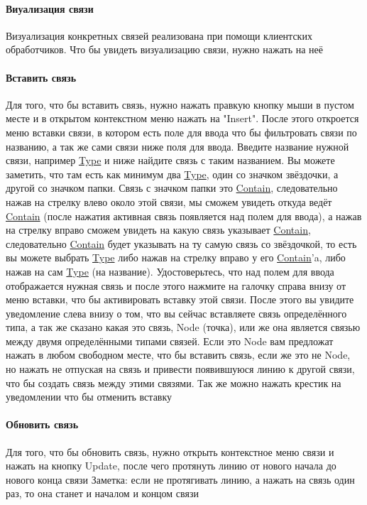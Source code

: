 \documentclass{article}
\begin{document}
\paragraph{Виуализация связи}
Визуализация конкретных связей реализована при помощи клиентских обработчиков.
Что бы увидеть визуализацию связи, нужно нажать на неё
\paragraph{Вставить связь}
Для того, что бы \hypertarget{DeepCase.InsertLink.Def}{вставить связь}, нужно нажать правкую кнопку мыши в пустом
месте и в открытом контекстном меню нажать на "Insert". После этого откроется
меню вставки связи, в котором есть поле для ввода что бы фильтровать связи по
названию, а так же сами связи ниже поля для ввода. Введите название нужной
связи, например \hyperlink{type.Def}{Type} и ниже найдите связь с таким
названием. Вы можете
заметить, что там есть как минимум два \hyperlink{type.Def}{Type}, один со
значком звёздочки, а
другой со значком папки. Связь с значком папки это
\hyperlink{Contain.Def}{Contain}, следовательно нажав
на стрелку влево около этой связи, мы сможем увидеть откуда ведёт
\hyperlink{Contain.Def}{Contain}
(после нажатия активная связь появляется над полем для ввода), а нажав на
стрелку вправо сможем увидеть на какую связь указывает
\hyperlink{Contain.Def}{Contain}, следовательно
\hyperlink{Contain.Def}{Contain} будет указывать на ту самую связь со
звёздочкой, то есть вы можете
выбрать \hyperlink{type.Def}{Type} либо нажав на стрелку вправо у его
\hyperlink{Contain.Def}{Contain}'a, либо нажав на сам
\hyperlink{type.Def}{Type} (на название). Удостоверьтесь, что над полем для
ввода отображается нужная
связь и после этого нажмите на галочку справа внизу от меню вставки, что бы
активировать вставку этой связи. После этого вы увидите уведомление слева внизу
о том, что вы сейчас вставляете связь определённого типа, а так же сказано
какая это связь, Node (точка), или же она является связью между двумя
определёнными типами связей. Если это Node вам предложат нажать в любом
свободном месте, что бы вставить связь, если же это не Node, но нажать не
отпуская на связь и привести появившуюся линию к другой связи, что бы создать
связь между этими связями. Так же можно нажать крестик на уведомлении что бы
отменить вставку
\paragraph{Обновить связь}
Для того, что бы обновить связь, нужно открыть контекстное меню связи и нажать
на кнопку Update, после чего протянуть линию от нового начала до нового конца
связи
Заметка: если не протягивать линию, а нажать на связь один раз, то она станет и
началом и концом связи
\end{document}
